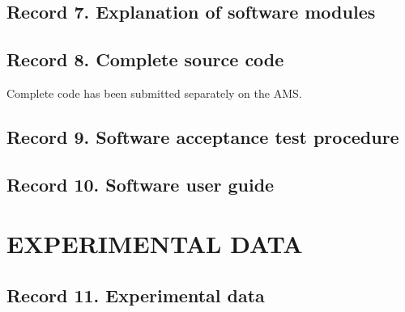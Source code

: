 \newpage
\subsection{Record 7. Explanation of software modules}

\newpage
\subsection{Record 8. Complete source code}
Complete code has been submitted separately on the AMS.

\newpage
\subsection{Record 9. Software acceptance test procedure}

\newpage
\subsection{Record 10. Software user guide}



\section{EXPERIMENTAL DATA}

\subsection{Record 11. Experimental data}




